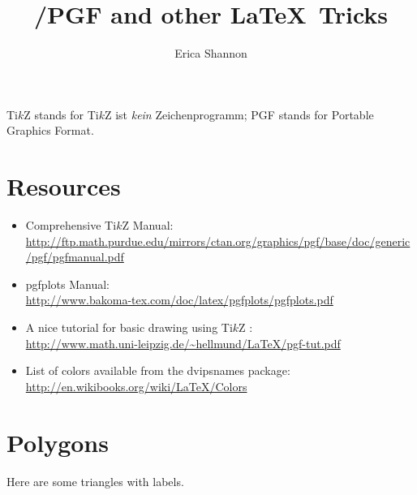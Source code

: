 \documentclass[12pt]{article}
\title{\TikZ/PGF and other \LaTeX  \, Tricks}
\author{Erica Shannon}
\date{}
\newcommand{\TikZ}{Ti$k$Z }
\begin{document}
\setlength\parindent{0pt}

\maketitle

\tableofcontents

\vfill

\TikZ stands for \TikZ ist \emph{kein} Zeichenprogramm; PGF stands for Portable Graphics Format.

\vfill

\section{Resources}

\footnotesize

\begin{itemize}
\item Comprehensive \TikZ Manual: \\ \url{http://ftp.math.purdue.edu/mirrors/ctan.org/graphics/pgf/base/doc/generic/pgf/pgfmanual.pdf}
\item \ttfamily pgfplots \rmfamily Manual: \\ \url{http://www.bakoma-tex.com/doc/latex/pgfplots/pgfplots.pdf}
\item A nice tutorial for basic drawing using \TikZ: \\ \url{http://www.math.uni-leipzig.de/~hellmund/LaTeX/pgf-tut.pdf}
\item List of colors available from the \ttfamily dvipsnames \rmfamily package: \\ \url{http://en.wikibooks.org/wiki/LaTeX/Colors}
\end{itemize}

\normalsize

\newpage
\section{Polygons}

Here are some triangles with labels.

\bigskip
\end{document}
